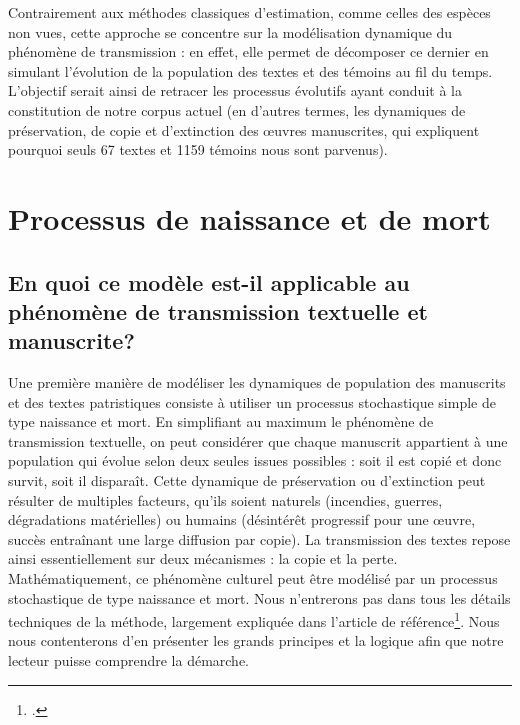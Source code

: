\documentclass[a4paper,twoside,12pt]{book}
\begin{document}
Contrairement aux méthodes classiques d’estimation, comme celles des espèces non vues, cette approche se concentre sur la modélisation dynamique du phénomène de transmission : en effet, elle permet de décomposer ce dernier en simulant l’évolution de la population des textes et des témoins au fil du temps. L’objectif serait ainsi de retracer les processus évolutifs ayant conduit à la constitution de notre corpus actuel (en d’autres termes, les dynamiques de préservation, de copie et d’extinction des œuvres manuscrites, qui expliquent pourquoi seuls 67 textes et 1159 témoins nous sont parvenus). 


%

\section{Processus de naissance et de mort}

\subsection{En quoi ce modèle est-il applicable au phénomène de transmission textuelle et manuscrite?}

Une première manière de modéliser les dynamiques de population des manuscrits et des textes patristiques consiste à utiliser un processus stochastique simple de type naissance et mort. En simplifiant au maximum le phénomène de transmission textuelle, on peut considérer que chaque manuscrit appartient à une population qui évolue selon deux seules issues possibles : soit il est copié et donc survit, soit il disparaît. Cette dynamique de préservation ou d’extinction peut résulter de multiples facteurs, qu’ils soient naturels (incendies, guerres, dégradations matérielles) ou humains (désintérêt progressif pour une œuvre, succès entraînant une large diffusion par copie). La transmission des textes repose ainsi essentiellement sur deux mécanismes : la copie et la perte. Mathématiquement, ce phénomène culturel peut être modélisé par un processus stochastique de type naissance et mort. Nous n'entrerons pas dans tous les détails techniques de la méthode, largement expliquée dans l’article de référence\footcite{camps_transmission_2025}. Nous nous contenterons d'en présenter les grands principes et la logique afin que notre lecteur puisse comprendre la démarche.
\end{document}
